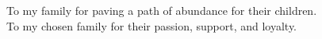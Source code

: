 \begin{dedication}
    To my family for paving a path of abundance for their children.\\
    To my chosen family for their passion, support, and loyalty.
\end{dedication}